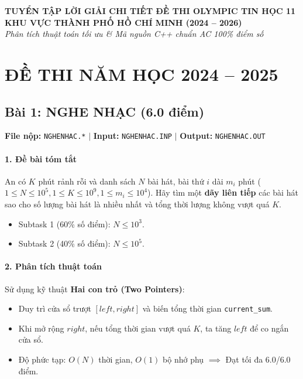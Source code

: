 \documentclass[11pt,a4paper]{article}
\begin{document}
\begin{center}
    {\Large\bfseries TUYỂN TẬP LỜI GIẢI CHI TIẾT ĐỀ THI OLYMPIC TIN HỌC 11}\\[4pt]
    {\large\textbf{KHU VỰC THÀNH PHỐ HỒ CHÍ MINH (2024 -- 2026)}}\\[4pt]
    \textit{Phân tích thuật toán tối ưu \& Mã nguồn C++ chuẩn AC 100\% điểm số}
\end{center}

\vspace{0.4cm}

\tableofcontents

\newpage

\section{ĐỀ THI NĂM HỌC 2024 -- 2025}

\subsection{Bài 1: NGHE NHẠC (6.0 điểm)}
\textbf{File nộp:} \texttt{NGHENHAC.*} $\vert$ \textbf{Input:} \texttt{NGHENHAC.INP} $\vert$ \textbf{Output:} \texttt{NGHENHAC.OUT}

\paragraph{1. Đề bài tóm tắt}
An có $K$ phút rảnh rỗi và danh sách $N$ bài hát, bài thứ $i$ dài $m_i$ phút ($1 \le N \le 10^5, 1 \le K \le 10^9, 1 \le m_i \le 10^4$). Hãy tìm một \textbf{dãy liên tiếp} các bài hát sao cho số lượng bài hát là nhiều nhất và tổng thời lượng không vượt quá $K$.
\begin{itemize}
    \item Subtask 1 (60\% số điểm): $N \le 10^3$.
    \item Subtask 2 (40\% số điểm): $N \le 10^5$.
\end{itemize}

\paragraph{2. Phân tích thuật toán}
Sử dụng kỹ thuật \textbf{Hai con trỏ (Two Pointers)}:
\begin{itemize}
    \item Duy trì cửa sổ trượt $[left, right]$ và biến tổng thời gian \texttt{current\_sum}.
    \item Khi mở rộng $right$, nếu tổng thời gian vượt quá $K$, ta tăng $left$ để co ngắn cửa sổ.
    \item Độ phức tạp: $O(N)$ thời gian, $O(1)$ bộ nhớ phụ $\implies$ Đạt tối đa 6.0/6.0 điểm.
\end{itemize}
\end{document}
